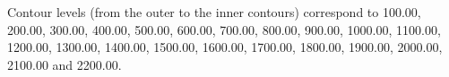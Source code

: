 Contour levels (from the outer to the inner contours) correspond to 100.00, 200.00, 300.00, 400.00, 500.00, 600.00, 700.00, 800.00, 900.00, 1000.00, 1100.00, 1200.00, 1300.00, 1400.00, 1500.00, 1600.00, 1700.00, 1800.00, 1900.00, 2000.00, 2100.00 and 2200.00.
